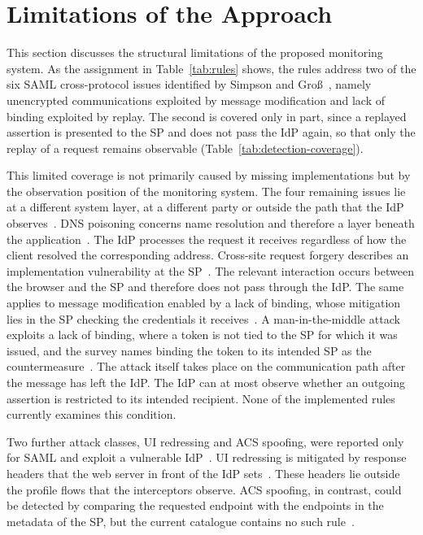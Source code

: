 \documentclass[../main.tex]{subfiles}
\begin{document}
\section{Limitations of the Approach}\label{sec:limitation}

This section discusses the structural limitations of the proposed monitoring system. 
As the assignment in Table~\ref{tab:rules} shows, the rules address two of the six SAML 
cross-protocol issues identified by Simpson and Groß~\cite{FIMSurvey}, namely unencrypted 
communications exploited by message modification and lack of binding exploited by replay. 
The second is covered only in part, since a replayed assertion is presented to the SP and does not 
pass the IdP again, so that only the replay of a request remains observable (Table~\ref{tab:detection-coverage}).

This limited coverage is not primarily caused by missing implementations but by the observation 
position of the monitoring system. 
The four remaining issues lie at a different system layer, at a different party or outside the path 
that the IdP observes~\cite{FIMSurvey}. 
DNS poisoning concerns name resolution and therefore a layer beneath the application~\cite{FIMSurvey}. 
The IdP processes the request it receives regardless of how the client resolved the corresponding 
address. 
Cross-site request forgery describes an implementation vulnerability at the SP~\cite{FIMSurvey}. 
The relevant interaction occurs between the browser and the SP and therefore does not pass 
through the IdP. 
The same applies to message modification enabled by a lack of binding, whose mitigation lies in 
the SP checking the credentials it receives~\cite{FIMSurvey}. 
A man-in-the-middle attack exploits a lack of binding, where a token is not tied to the SP for which 
it was issued, and the survey names binding the token to its intended SP as the countermeasure~\cite{FIMSurvey}. 
The attack itself takes place on the communication path after the message has left the IdP. 
The IdP can at most observe whether an outgoing assertion is restricted to its intended recipient. 
None of the implemented rules currently examines this condition. 

Two further attack classes, UI redressing and ACS spoofing, were reported only for SAML and exploit a 
vulnerable IdP~\cite{FIMSurvey}. 
UI redressing is mitigated by response headers that the web server in front of the IdP sets~\cite{GuardiansClouds, ShibbolethGIAC}. 
These headers lie outside the profile flows that the interceptors observe. 
ACS spoofing, in contrast, could be detected by comparing the requested endpoint with the endpoints in 
the metadata of the SP, but the current catalogue contains no such rule~\cite{GuardiansClouds, MetadataForSP}. 
\end{document}
